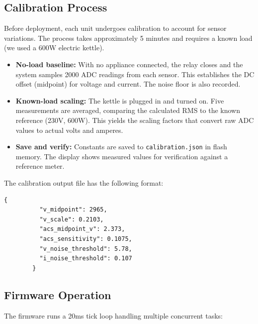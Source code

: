\documentclass[12pt, a4paper]{article}
\begin{document}
	\subsection{Calibration Process}
	
	Before deployment, each unit undergoes calibration to account for sensor variations. The process takes approximately 5 minutes and requires a known load (we used a 600W electric kettle).
	
	\begin{itemize}[]
	\item[Step 1:] \textbf{No-load baseline:} With no appliance connected, the relay closes and the system samples 2000 ADC readings from each sensor. This establishes the DC offset (midpoint) for voltage and current. The noise floor is also recorded.
	
	\item[Step 2:] \textbf{Known-load scaling:} The kettle is plugged in and turned on. Five measurements are averaged, comparing the calculated RMS to the known reference (230V, 600W). This yields the scaling factors that convert raw ADC values to actual volts and amperes.
	
	\item[Step 3:] \textbf{Save and verify:} Constants are saved to \texttt{calibration.json} in flash memory. The display shows measured values for verification against a reference meter.
	\end{itemize}
	
	The calibration output file has the following format:
	
	\begin{lstlisting}[basicstyle=\ttfamily\small, frame=single]
		{
		  "v_midpoint": 2965,
		  "v_scale": 0.2103,
		  "acs_midpoint_v": 2.373,
		  "acs_sensitivity": 0.1075,
		  "v_noise_threshold": 5.78,
		  "i_noise_threshold": 0.107
		}
	\end{lstlisting}
	
	\subsection{Firmware Operation}
	
	The firmware runs a 20ms tick loop handling multiple concurrent tasks:
	
\end{document}
